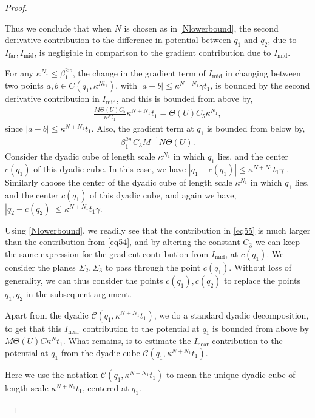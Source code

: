 \documentclass{article}
\theoremstyle{plain}
\theoremstyle{plain}
\newcommand{\thee}{\Theta(U)}
\theoremstyle{definition}
\theoremstyle{plain}
\begin{document}
\begin{proof}
\begin{itemize}
Thus we conclude that when $N$ is chosen as in \cref{Nlowerbound}, the second
derivative contribution to the difference in potential between $q_1$ and $q_2$,
due to $I_{\text{far}}, I_{\text{mid}}$, is negligible in comparison to the gradient contribution due to $I_{\text{mid}}$.

For any $\kappa^{N_1}\leq \beta_1^{2w}$, the change in the gradient term of $I_{\text{mid}}$ in changing between two points $a,b\in C(q_1,\kappa^{N t_1})$, with $|a-b|\leq \kappa^{N+N_1}\gamma t_1$, is bounded by the second derivative contribution in $I_{\text{mid}}$, and this is bounded from above by, 
\begin{align}\label{eq54}
    \frac{M\Theta(U)C_5}{\kappa^N t_1}\kappa^{N+N_1}t_1=\Theta(U)C_5\kappa^{N_1},
\end{align}
since $|a-b|\leq \kappa^{N+N_1}t_1$. Also, the gradient term at $q_1$ is bounded from below by, 
\begin{align}\label{eq55}
    \beta_1^{2w}C_3 M^{-1}N\Theta(U).
\end{align}
Consider the dyadic cube of length scale $\kappa^{N_1}$ in which $q_1$ lies, and the center $c(q_1)$ of this dyadic cube. In this case, we have $|q_1-c(q_1)|\leq \kappa^{N+N_1}t_1\gamma$ . Similarly choose the center of the dyadic cube of length scale $\kappa^{N_1}$ in which $q_1$ lies, and the center $c(q_1)$ of this dyadic cube, and again we have, $|q_2-c(q_2)|\leq \kappa^{N+N_1}t_1\gamma$. 

 Using \cref{Nlowerbound}, we readily see that the contribution in \cref{eq55} is much larger than the contribution from \cref{eq54}, and by altering the constant $C_3$ we can keep the same expression for the gradient contribution from $I_{\text{mid}}$, at $c(q_1)$. We consider the planes $\Sigma_2,\Sigma_3$ to pass through the point $c(q_1)$. Without loss of generality, we can thus consider the points $c(q_1), c(q_2)$ to replace the points $q_1,q_2$ in the subsequent argument.

Apart from the dyadic $\mathcal{C}(q_1, \kappa^{N+N_1} t_1)$, we do a standard dyadic decomposition, to get that this $I_{\text{near}}$ contribution to the potential at $q_1$ is bounded from above by $M\thee C\kappa^{N}t_1.$
What remains, is to estimate the $I_{\text{near}}$ contribution to the potential at $q_1$ from the dyadic cube $\mathcal{C}(q_1, \kappa^{N+N_1} t_1)$.

Here we use the notation $\mathcal{C}(q_1,\kappa^{N+N_1}t_1)$ to mean the unique dyadic cube of length scale $\kappa^{N+N_1}t_1$, centered at $q_1$.



\end{itemize}
\end{proof}
\end{document}
